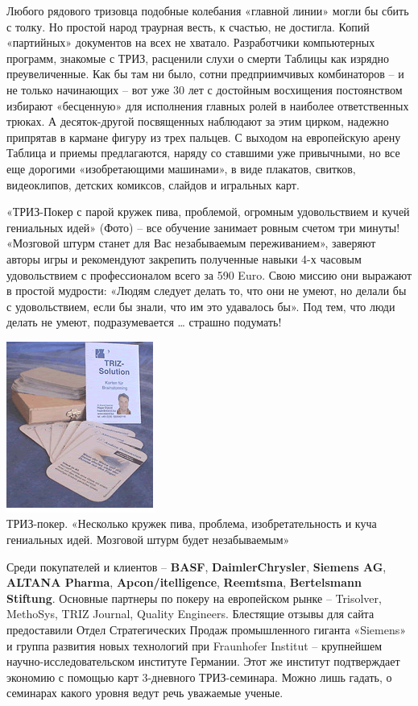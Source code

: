 \documentclass[11pt,a4paper]{article}
\begin{document}
Любого рядового тризовца подобные колебания «главной линии» могли бы сбить с
толку. Но простой народ траурная весть, к счастью, не достигла. Копий
«партийных» документов на всех не хватало. Разработчики компьютерных программ,
знакомые с ТРИЗ, расценили слухи о смерти Таблицы как изрядно преувеличенные.
Как бы там ни было, сотни предприимчивых комбинаторов -- и не только
начинающих -- вот уже 30 лет с достойным восхищения постоянством избирают
«бесценную» для исполнения главных ролей в наиболее ответственных трюках. А
десяток-другой посвященных наблюдают за этим цирком, надежно припрятав в
кармане фигуру из трех пальцев. С выходом на европейскую арену Таблица и
приемы предлагаются, наряду со ставшими уже привычными, но все еще дорогими
«изобретающими машинами», в виде плакатов, свитков, видеоклипов, детских
комиксов, слайдов и игральных карт.

«ТРИЗ-Покер с парой кружек пива, проблемой, огромным удовольствием и кучей
гениальных идей» (Фото) -- все обучение занимает ровным счетом три минуты!
«Мозговой штурм станет для Вас незабываемым переживанием», заверяют авторы
игры и рекомендуют закрепить полученные навыки 4-х часовым удовольствием с
профессионалом всего за 590 Euro. Свою миссию они выражают в простой мудрости:
«Людям следует делать то, что они не умеют, но делали бы с удовольствием, если
бы знали, что им это удавалось бы». Под тем, что люди делать не умеют,
подразумевается … страшно подумать!

\begin{center}
  \includegraphics[width=.5\textwidth]{./7.jpg} \\
  ТРИЗ-покер. «Несколько кружек пива, проблема, изобретательность и куча
  гениальных идей. Мозговой штурм будет незабываемым»
\end{center}
Среди покупателей и клиентов -- \textbf{BASF}, \textbf{DaimlerChrysler},
\textbf{Siemens AG}, \textbf{ALTANA Pharma}, \textbf{Apcon/itelligence},
\textbf{Reemtsma}, \textbf{Bertelsmann Stiftung}. Основные партнеры по покеру
на европейском рынке -- Trisolver, MethoSys, TRIZ Journal, Quality Engineers.
Блестящие отзывы для сайта предоставили Отдел Стратегических Продаж
промышленного гиганта «Siemens» и группа развития новых технологий при
Fraunhofer Institut -- крупнейшем научно-исследовательском институте Германии.
Этот же институт подтверждает экономию с помощью карт 3-дневного
ТРИЗ-семинара.  Можно лишь гадать, о семинарах какого уровня ведут речь
уважаемые ученые.
\end{document}
